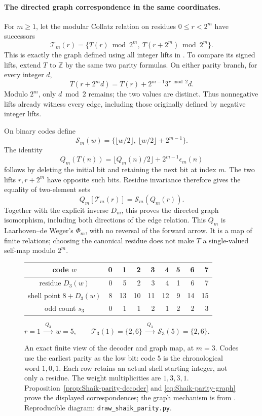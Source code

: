 \paragraph{The directed graph correspondence in the same coordinates.}
For \(m\ge1\), let the modular Collatz relation on residues
\(0\le r<2^m\) have successors
\[
 \mathcal T_m(r)=
 \{T(r)\bmod2^m,\ T(r+2^m)\bmod2^m\}.
\]
This is exactly the graph defined using all integer lifts in
\cite[Section~2]{LaarhovenDeWeger2012}. To compare its signed lifts,
extend \(T\) to \(\mathbb Z\) by the same two parity formulas.
On either parity branch, for every integer \(d\),
\[
 T(r+2^m d)=T(r)+2^{m-1}3^{r\bmod2}d .
\]
Modulo \(2^m\), only \(d\bmod2\) remains; the two values are distinct.
Thus nonnegative lifts already witness every edge, including those
originally defined by negative integer lifts.

On binary codes define
\[
 \mathcal S_m(w)=
 \{\lfloor w/2\rfloor,\ \lfloor w/2\rfloor+2^{m-1}\}.
\]
The identity
\begin{equation}\label{eq:Shaik-parity-graph}
 Q_m(T(n))=\lfloor Q_m(n)/2\rfloor
                 +2^{m-1}\epsilon_m(n)
\end{equation}
follows by deleting the initial bit and retaining the next bit at
index \(m\). The two lifts \(r,r+2^m\) have opposite such bits.
Residue invariance therefore gives the equality of two-element sets
\[
 Q_m[\mathcal T_m(r)]=\mathcal S_m(Q_m(r)).
\]
Together with the explicit inverse \(D_m\), this proves the directed
graph isomorphism, including both directions of the edge relation.
This \(Q_m\) is Laarhoven--de Weger's \(\Phi_m\), with no reversal of
the forward arrow. It is a map of finite relations; choosing the
canonical residue does not make \(T\) a single-valued self-map
modulo \(2^m\).

\begin{figure}[ht]
\centering
\begin{tabular}{c|rrrrrrrr}
code \(w\)&0&1&2&3&4&5&6&7\\ \hline
residue \(D_3(w)\)&0&5&2&3&4&1&6&7\\
shell point \(8+D_3(w)\)&8&13&10&11&12&9&14&15\\
odd count \(s_3\)&0&1&1&2&1&2&2&3
\end{tabular}

\smallskip
\(r=1 \ \xrightarrow{\ Q_3\ }\ w=5,\qquad
 \mathcal T_3(1)=\{2,6\}
 \ \xrightarrow{\ Q_3\ }\ \mathcal S_3(5)=\{2,6\}.\)
\caption{An exact finite view of the decoder and graph map, at \(m=3\).
Codes use the earliest parity as the low bit: code \(5\) is the
chronological word \(1,0,1\). Each row retains an actual shell starting
integer, not only a residue. The weight multiplicities are \(1,3,3,1\).
Proposition~\ref{prop:Shaik-parity-decoder} and
\eqref{eq:Shaik-parity-graph} prove the displayed correspondences;
the graph mechanism is from
\cite[Section~2]{LaarhovenDeWeger2012}. Reproducible diagram:
\texttt{draw\_shaik\_parity.py}.}
\label{fig:Shaik-parity}
\end{figure}

